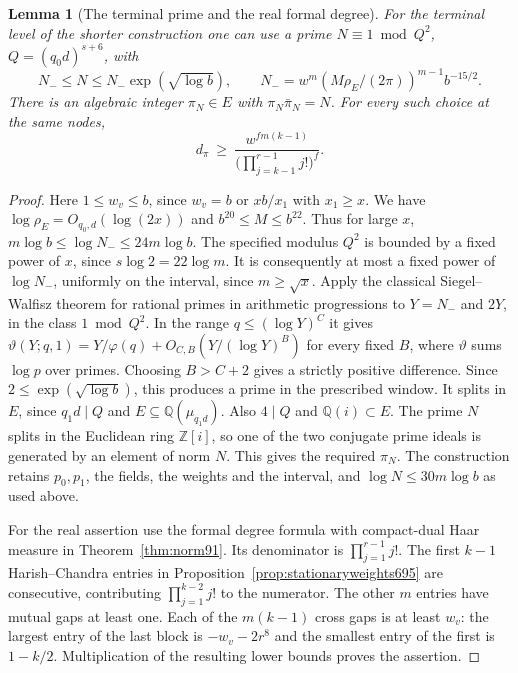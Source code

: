 \documentclass[a4paper,11pt]{article}
\newtheorem{lemma}[proposition]{Lemma}
\theoremstyle{definition}
\theoremstyle{remark}
\numberwithin{equation}{section}
\begin{document}
\begin{lemma}[The terminal prime and the real formal degree]\leavevmode
\label{lem:calibratedlevel703}
For the terminal level of the shorter construction one can use
a prime \(N\equiv1\bmod Q^2\), \(Q=(q_0d)^{s+6}\), with
\[
 N_-\le N\le N_-\exp(\sqrt{\log b}),\qquad
 N_-=w^m(M\rho_E/(2\pi))^{m-1}b^{-15/2}.
\]
There is an algebraic integer \(\pi_N\in E\) with
\(\pi_N\bar\pi_N=N\). For every such choice at the same nodes,
\[
         d_\pi\ \ge\
          \frac{w^{fm(k-1)}}{\big(\prod_{j=k-1}^{r-1}j!\big)^f}.
\]
\end{lemma}
\begin{proof}
Here \(1\le w_v\le b\), since \(w_v=b\) or \(xb/x_1\)
with \(x_1\ge x\). We have \(\log \rho_E=O_{q_0,d}(\log(2x))\)
and \(b^{20}\le M\le b^{22}\). Thus for large \(x\),
\(m\log b\le\log N_-\le24m\log b\). The specified modulus
\(Q^2\) is bounded by a fixed power of \(x\), since
\(s\log 2=22\log m\). It is consequently at most a fixed
power of \(\log N_-\), uniformly on the interval, since
\(m\ge\sqrt{x}\). Apply the classical Siegel--Walfisz theorem
for rational primes in arithmetic progressions to \(Y=N_-\)
and \(2Y\), in the class \(1\bmod Q^2\). In the range
\(q\le(\log Y)^C\) it gives
\(\vartheta(Y;q,1)=Y/\varphi(q)+O_{C,B}(Y/(\log Y)^B)\)
for every fixed \(B\), where \(\vartheta\) sums \(\log p\)
over primes. Choosing \(B>C+2\) gives a strictly positive
difference. Since \(2\le\exp(\sqrt{\log b})\), this produces
a prime in the prescribed window. It splits in \(E\), since
\(q_1d\mid Q\) and \(E\subseteq\mathbb Q(\mu_{q_1d})\).
Also \(4\mid Q\) and \(\mathbb Q(i)\subset E\). The prime
\(N\) splits in the Euclidean ring \(\mathbb Z[i]\), so one
of the two conjugate prime ideals is generated by an element
of norm \(N\). This gives the required \(\pi_N\).
The construction retains \(p_0,p_1\), the fields, the weights
and the interval, and \(\log N\le30m\log b\) as used above.

For the real assertion use the formal degree formula with
compact-dual Haar measure in Theorem~\ref{thm:norm91}. Its
denominator is \(\prod_{j=1}^{r-1} j!\). The first \(k-1\)
Harish--Chandra entries in Proposition~\ref{prop:stationaryweights695}
are consecutive, contributing \(\prod_{j=1}^{k-2}j!\) to the
numerator. The other \(m\) entries have mutual gaps at least
one. Each of the \(m(k-1)\) cross gaps is at least \(w_v\):
the largest entry of the last block is \(-w_v-2r^8\) and
the smallest entry of the first is \(1-k/2\). Multiplication
of the resulting lower bounds proves the assertion.
\end{proof}
\end{document}
